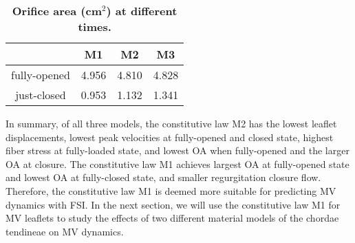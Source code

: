 \documentclass[fleqn,10pt]{wlscirep}
\begin{document}
\begin{table}[!h]
	\centering
	\caption{\bf Orifice area (cm$^2$) at different times.}
	\begin{tabular}{cccc}
		\hline
		& M1 & M2 & M3 \\\hline
		fully-opened & 4.956 & 4.810 & 4.828 \\
		just-closed & 0.953 & 1.132 & 1.341 \\
		\hline
	\end{tabular}
	\label{OA}
\end{table}









In summary, of all three models, the constitutive law M2 has the lowest leaflet displacements, lowest peak velocities at fully-opened and closed state, highest fiber stress at fully-loaded state, and lowest OA when fully-opened and the larger OA at closure. The constitutive law M1 achieves largest OA at fully-opened state and lowest OA at fully-closed state, and smaller regurgitation closure flow. Therefore, the constitutive law M1 is deemed more suitable for predicting MV dynamics with FSI. In the next section, we will use the constitutive law M1 for MV leaflets to study the effects of two different material models of the chordae tendineae on MV dynamics.
\end{document}
